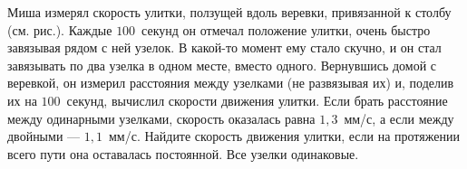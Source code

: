 Миша измерял скорость улитки, ползущей вдоль веревки, привязанной к столбу (см. рис.). Каждые $100$~секунд он отмечал положение улитки, очень быстро завязывая рядом с ней узелок. В какой-то момент ему стало скучно, и он стал завязывать по два узелка в одном месте, вместо одного. Вернувшись домой с веревкой, он измерил расстояния между узелками (не развязывая их) и, поделив их на $100$~секунд, вычислил скорости движения улитки. Если брать расстояние между одинарными узелками, скорость оказалась равна $1{,}3$~мм/с, а если между двойными --- $1{,}1$~мм/с. Найдите скорость движения улитки, если на протяжении всего пути она оставалась постоянной. Все узелки одинаковые. 